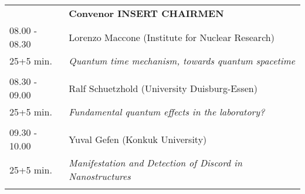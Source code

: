 \begin{longtable}{p{3cm}p{13cm}}
&\hfill {\bf Convenor INSERT CHAIRMEN }\\ 
08.00 - 08.30 & Lorenzo Maccone (Institute for Nuclear Research)\\ 
25+5 min. & {\it Quantum time mechanism, towards quantum spacetime}\\ 
 & \\ 
08.30 - 09.00 & Ralf Schuetzhold (University Duisburg-Essen)\\ 
25+5 min. & {\it Fundamental quantum effects in the laboratory?}\\ 
 & \\ 
09.30 - 10.00 & Yuval Gefen (Konkuk University)\\ 
25+5 min. & {\it Manifestation and Detection of Discord in Nanostructures}\\ 
 & \\ 
\end{longtable}

